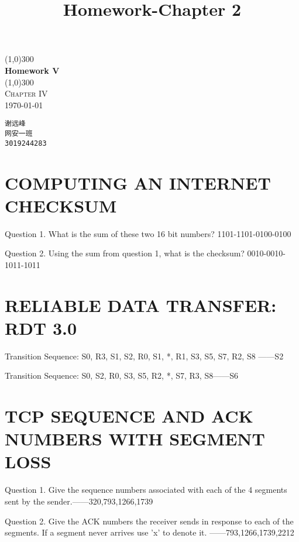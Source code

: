 \documentclass[UTF8]{article}
\title{Homework-Chapter 2}
\begin{document}
\begin{titlepage}
    \begin{center}
        \line(1,0){300}\\
        [0.65cm]
        \huge{\bfseries Homework V }\\
        \line(1,0){300}\\
        \textsc{\Large Chapter IV}\\
        \textnormal{\Large \today}\\
        [5.5cm]
    \end{center}
    \begin{flushright}
        \texttt{\Large 谢远峰\\网安一班\\3019244283}\\
        [0.5cm]
    \end{flushright}
\end{titlepage}
\clearpage
\section*{COMPUTING AN INTERNET CHECKSUM}
Question 1. What is the sum of these two 16 bit numbers?
1101-1101-0100-0100

Question 2. Using the sum from question 1, what is the checksum?
0010-0010-1011-1011
\section*{RELIABLE DATA TRANSFER: RDT 3.0}
Transition Sequence: S0, R3, S1, S2, R0, S1, *, R1, S3, S5, S7, R2, S8
——S2

Transition Sequence:  S0, S2, R0, S3, S5, R2, *, S7, R3, S8——S6
\section*{TCP SEQUENCE AND ACK NUMBERS WITH SEGMENT LOSS}
Question 1. Give the sequence numbers associated with each of the 4 segments sent by the sender.——320,793,1266,1739

Question 2. Give the ACK numbers the receiver sends in response to each of the segments. If a segment never arrives use 'x' to denote it.
——793,1266,1739,2212
\end{document}
